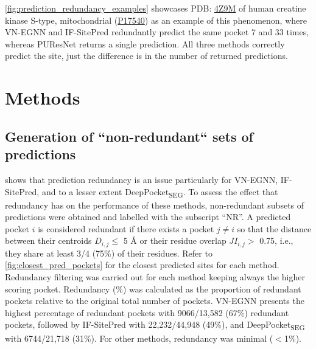 \autoref{fig:prediction_redundancy_examples} showcases PDB: \href{https://www.ebi.ac.uk/pdbe/entry/pdb/4z9m}{4Z9M} \cite{PDB_4Z9M} of human creatine kinase S-type, mitochondrial (\href{https://www.uniprot.org/uniprotkb/P17540/entry}{P17540}) as an example of this phenomenon, where VN-EGNN and IF-SitePred redundantly predict the same pocket 7 and 33 times, whereas PUResNet returns a single prediction. All three methods correctly predict the site, just the difference is in the number of returned predictions.

\section{Methods}

\subsection{Generation of ``non-redundant`` sets of predictions}

 shows that prediction redundancy is an issue particularly for VN-EGNN, IF-SitePred, and to a lesser extent DeepPocket\textsubscript{SEG}. To assess the effect that redundancy has on the performance of these methods, non-redundant subsets of predictions were obtained and labelled with the subscript ``NR''. A predicted pocket $i$ is considered redundant if there exists a pocket $j \neq i$ so that the distance between their centroids $D_{i,j} \leq$ 5 \AA{} or their residue overlap $JI_{i,j} >$ 0.75, i.e., they share at least 3/4 (75\%) of their residues. Refer to \autoref{fig:closest_pred_pockets} for the closest predicted sites for each method. Redundancy filtering was carried out for each method keeping always the higher scoring pocket. Redundancy (\%) was calculated as the proportion of redundant pockets relative to the original total number of pockets. VN-EGNN presents the highest percentage of redundant pockets with 9066/13,582 (67\%) redundant pockets, followed by IF-SitePred with 22,232/44,948 (49\%), and DeepPocket\textsubscript{SEG} with 6744/21,718 (31\%). For other methods, redundancy was minimal ($<$1\%).

